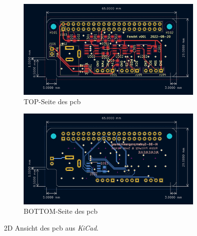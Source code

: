 \begin{figure}[H]
    \centering
    \begin{subfigure}{1.0\textwidth}
        \centering
        \includegraphics[width=15cm]{./img/pcb-2d-top.png}
        \caption{TOP-Seite des \gls{pcb}}
    \end{subfigure}
    \begin{subfigure}{1.0\textwidth}
        \centering
        \includegraphics[width=15cm]{./img/pcb-2d-bottom.png}
        \caption{BOTTOM-Seite des \gls{pcb}}
    \end{subfigure}
    \caption{2D Ansicht des \gls{pcb} aus \textit{KiCad}.}
    \label{fig:pcb-2d}
\end{figure}
\newpage

